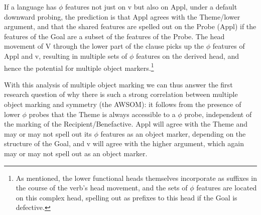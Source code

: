 \documentclass[output=paper
,modfonts
,nonflat]{langsci/langscibook}
\begin{document}
\begin{figure}[!h]
\begin{exe}
\end{exe} \vspace{-1.1cm}
\end{figure}
\noindent If a language has $\phi$ features not just on v but also on Appl, under a default downward probing, the prediction is that Appl agrees with the Theme/lower argument, and that the shared features are spelled out on the Probe (Appl) if the features of the Goal are a subset of the features of the Probe. The head movement of V through the lower part of the clause picks up the $\phi$ features of Appl and v, resulting in multiple sets of $\phi$ features on the derived head, and hence the potential for multiple object markers.\footnote{As mentioned, the lower functional heads themselves incorporate as suffixes in the course of the verb’s head movement, and the sets of $\phi$ features are located on this complex head, spelling out as prefixes to this head if the Goal is defective.} 

With this analysis of multiple object marking we can thus answer the first research question of why there is such a strong correlation between multiple object marking and symmetry (the AWSOM): it follows from the presence of lower $\phi$ probes that the Theme is always accessible to a $\phi$ probe, independent of the marking of the Recipient/Benefactive. Appl will agree with the Theme and may or may not spell out its $\phi$ features as an object marker, depending on the structure of the Goal, and v will agree with the higher argument, which again may or may not spell out as an object marker. 
\end{document}
